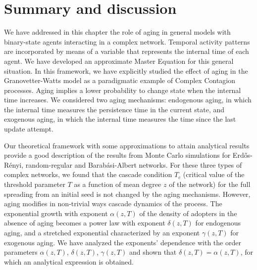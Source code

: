 \section{\label{sec:Summary and Conclusions} Summary and discussion}

We have addressed in this chapter the role of aging in general models with binary-state agents interacting in a complex network. Temporal activity patterns are incorporated by means of a variable that represents the internal time of each agent. We have developed an approximate Master Equation for this general situation. In this framework, we have explicitly studied the effect of aging in the Granovetter-Watts model as a paradigmatic example of Complex Contagion processes. Aging implies a lower probability to change state when the internal time increases. We considered  two aging mechanisms: endogenous aging, in which the internal time measures the persistence time in the current state, and exogenous aging, in which the internal time measures the time since the last update attempt.


Our theoretical framework with some approximations to attain analytical results provide a good description of the results from Monte Carlo simulations for Erd\H{o}s-R\'enyi, random-regular and Barab\'asi-Albert networks. For these three types of complex networks, we found that the cascade condition $T_c$ (critical value of the threshold parameter $T$ as a function of mean degree $z$ of the network) for the full spreading from an initial seed is not changed by the aging mechanisms. However, aging modifies in non-trivial ways cascade dynamics of the process. The exponential growth with exponent $\alpha(z,T)$ of the density of adopters in the absence of aging becomes a power law with exponent $\delta(z,T)$ for endogenous aging, and a stretched exponential characterized by an exponent $\gamma(z,T)$ for exogenous aging. We have analyzed the exponents' dependence with the order parameters $\alpha(z,T)$, $\delta(z,T)$, $\gamma(z,T)$ and shown that $\delta(z,T)=\alpha(z,T)$, for which an analytical expression is obtained.

